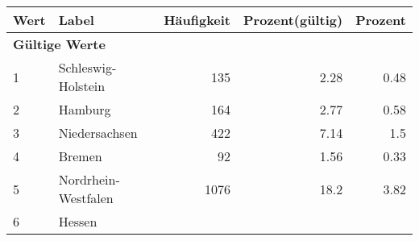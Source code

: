      \begin{longtable}{lXrrr}
     \toprule
     \textbf{Wert} & \textbf{Label} & \textbf{Häufigkeit} & \textbf{Prozent(gültig)} & \textbf{Prozent} \\
     \endhead
     \midrule
     \multicolumn{5}{l}{\textbf{Gültige Werte}}\\

     1 &
     \multicolumn{1}{X}{ Schleswig-Holstein   } &


       \num{135} &
       \num[round-mode=places,round-precision=2]{2.28} &
         \num[round-mode=places,round-precision=2]{0.48} \\

     2 &
     \multicolumn{1}{X}{ Hamburg   } &


       \num{164} &
       \num[round-mode=places,round-precision=2]{2.77} &
         \num[round-mode=places,round-precision=2]{0.58} \\

     3 &
     \multicolumn{1}{X}{ Niedersachsen   } &


       \num{422} &
       \num[round-mode=places,round-precision=2]{7.14} &
         \num[round-mode=places,round-precision=2]{1.5} \\

     4 &
     \multicolumn{1}{X}{ Bremen   } &


       \num{92} &
       \num[round-mode=places,round-precision=2]{1.56} &
         \num[round-mode=places,round-precision=2]{0.33} \\

     5 &
     \multicolumn{1}{X}{ Nordrhein-Westfalen   } &


       \num{1076} &
       \num[round-mode=places,round-precision=2]{18.2} &
         \num[round-mode=places,round-precision=2]{3.82} \\

     6 &
     \multicolumn{1}{X}{ Hessen   } &



\end{longtable}
